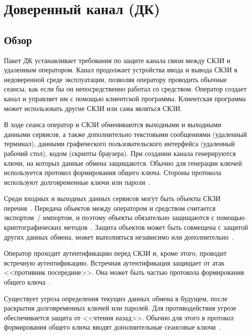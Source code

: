 \section{Доверенный канал (ДК)}\label{TC}

\subsection{Обзор}\label{TC.Intro}

Пакет ДК устанавливает требования по защите канала связи между СКЗИ и удаленным 
оператором. 
%
Канал продолжает устройства ввода и вывода СКЗИ в недоверенной среде 
эксплуатации, позволяя оператору проводить обычные сеансы,
как если бы он непосредственно работал со средством.
%
Оператор создает канал и управляет им с помощью клиентской программы. 
Клиентская программа может использовать другие СКЗИ или сама являться СКЗИ.  

В ходе сеанса оператор и СКЗИ обмениваются выходными и выходными данными 
сервисов, а также дополнительно текстовыми сообщениями (удаленный терминал),  
данными графического пользовательского интерфейса (удаленный рабочий стол),
кодом (скрипты браузера).
%
При создании канала генерируются ключи, на которых данные обмена защищаются. 
Обычно для генерации ключей используется протокол формирования общего 
ключа. Стороны протокола используют долговременные ключи или 
пароли~.

Среди входных и выходных данных сервисов могут быть объекты СКЗИ 
перечня~. Передача объектов между оператором и средством 
считается экспортом~/ импортом, и поэтому объекты обязательно защищаются с помощью 
криптографических методов~. Защита объектов 
может быть совмещена с защитой других данных обмена, может выполняться 
независимо или дополнительно~.

Оператор проходит аутентификацию перед СКЗИ и, кроме этого, проводит встречную 
аутентификацию. Встречная аутентификация защищает от атак <<противник 
посередине>>. Она может быть частью протокола формирования общего 
ключа~.

Существует угроза определения текущих данных обмена в будущем, после раскрытия 
долговременных ключей или паролей. Для противодействия угрозе обеспечивается 
защита от <<чтения назад>>. Обычно для этого в протокол формирования общего ключа
вводят дополнительные сеансовые ключи~. 

